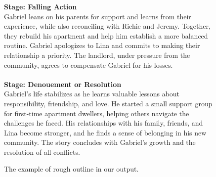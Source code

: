 \begin{figure}[htbp]
\begin{tcolorbox}
\textbf{Stage: Falling Action}\\
Gabriel leans on his parents for support and learns from their experience, while also reconciling with Richie and Jeremy. Together, they rebuild his apartment and help him establish a more balanced routine. Gabriel apologizes to Lina and commits to making their relationship a priority. The landlord, under pressure from the community, agrees to compensate Gabriel for his losses.\\
\\
\textbf{Stage: Denouement or Resolution}\\
Gabriel's life stabilizes as he learns valuable lessons about responsibility, friendship, and love. He started a small support group for first-time apartment dwellers, helping others navigate the challenges he faced. His relationships with his family, friends, and Lina become stronger, and he finds a sense of belonging in his new community. The story concludes with Gabriel's growth and the resolution of all conflicts.\\
\end{tcolorbox}
\caption{The example of rough outline in our output.}
\label{fig:rough example}
\end{figure}





